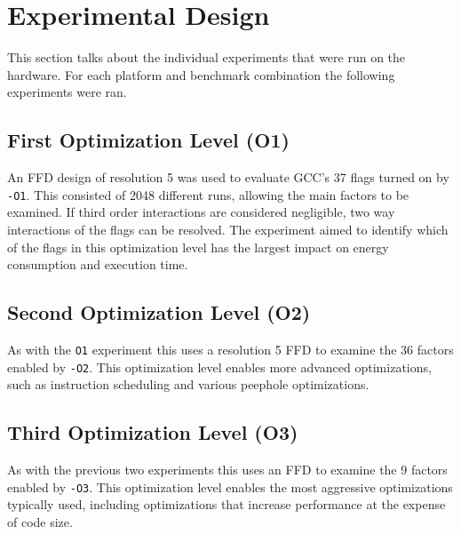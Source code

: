 \documentclass[twocolumn]{article}
\begin{document}
\section*{Experimental Design}

This section talks about the individual experiments that were run on the hardware. For each platform and benchmark combination the following experiments were ran.

\subsection*{First Optimization Level (O1)}

An FFD design of resolution 5 was used to evaluate GCC's 37 flags turned on by \texttt{-O1}. This consisted of 2048 different runs, allowing the main factors to be examined. If third order interactions are considered negligible, two way interactions of the flags can be resolved. The experiment aimed to identify which of the flags in this optimization level has the largest impact on energy consumption and execution time.

\subsection*{Second Optimization Level (O2)}

As with the \texttt{O1} experiment this uses a resolution 5 FFD to examine the 36 factors enabled by \texttt{-O2}. This optimization level enables more advanced optimizations, such as instruction scheduling and various peephole optimizations.

\subsection*{Third Optimization Level (O3)}

As with the previous two experiments this uses an FFD to examine the 9 factors enabled by \texttt{-O3}. This optimization level enables the most aggressive optimizations typically used, including optimizations that increase performance at the expense of code size.


\end{document}
